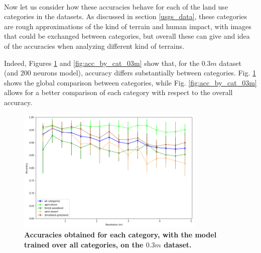 \

Now let us consider how these accuracies behave for each of the land use categories in the datasets. As discussed in section \ref{usgs_data}, these categories are rough approximations of the kind of terrain and human impact, with images that could be exchanged between categories, but overall these can give and idea of the accuracies when analyzing different kind of terrains. 

Indeed, Figures \ref{fig:acc_all_cat_03m} and \ref{fig:acc_by_cat_03m} show that, for the $0.3m$ dataset (and $200$ neurons model), accuracy differs substantially between categories. Fig. \ref{fig:acc_all_cat_03m} shows the global comparison between categories, while Fig. \ref{fig:acc_by_cat_03m} allows for a better comparison of each category with respect to the overall accuracy.

\begin{figure}[h!]
	\centering
	\includegraphics[width=0.8\textwidth]{Figures/results/acc_res_all_categories_03m.png}
	\captionsetup{width=1\linewidth}
	\caption{\textbf{Accuracies obtained for each category, with the model trained over all categories, on the $0.3m$ dataset.}}
	\label{fig:acc_all_cat_03m}
\end{figure}

